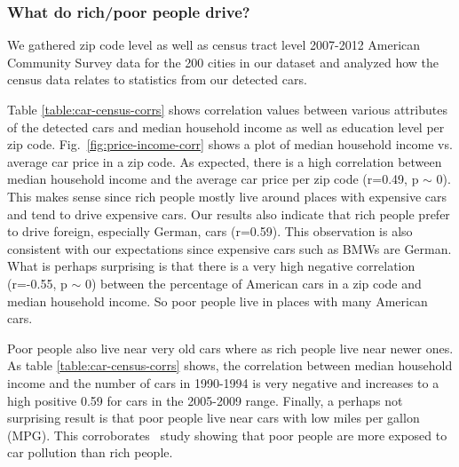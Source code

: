 \documentclass[10pt,twocolumn,letterpaper]{article}
\begin{document}
\subsubsection{What do rich/poor people drive?}
We gathered zip code level as well as census tract level 2007-2012 American Community Survey data for the 200 cities in our dataset and analyzed how the census data relates to statistics from our detected cars. 

Table \ref{table:car-census-corrs} shows correlation values between various attributes of the detected cars and median household income as well as education level per zip code. Fig.~\ref{fig:price-income-corr} shows a plot of median household income vs. average car price in a zip code. As expected, there is a high correlation between median household income and the average car price per zip code (r=0.49, p \(\sim\) 0). This makes sense since rich people mostly live around places with expensive cars and tend to drive expensive cars. Our results also indicate that rich people prefer to drive foreign, especially German, cars (r=0.59). This observation is also consistent with our expectations since expensive cars such as BMWs are German. What is perhaps surprising is that there is a very high negative correlation (r=-0.55, p \(\sim\) 0) between the percentage of American cars in a zip code and median household income. So poor people live in places with many American cars.

Poor people also live near very old cars where as rich people live near newer ones. As table \ref{table:car-census-corrs} shows, the correlation between median household income and the number of cars in 1990-1994 is very negative and increases to a high positive 0.59 for cars in the 2005-2009 range. Finally, a perhaps not surprising result is that poor people live near cars with low miles per gallon (MPG). This corroborates~\cite{cal-traffic-study} study showing that poor people are more exposed to car pollution than rich people.
 
\end{document}
